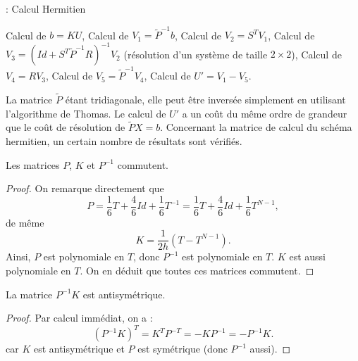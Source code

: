 \begin{center}
\begin{minipage}[H]{12cm}
  \begin{algorithm}[H]
    \caption{: Calcul Hermitien}\label{alg:SH}
    \begin{algorithmic}[1]
    \State Calcul de $b = K U$,
	\State Calcul de $V_1 = \tilde{P}^{-1} b$,
	\State Calcul de $V_2 = S^T V_1$,
	\State Calcul de $V_3 = (Id + S^T \tilde{P}^{-1}R)^{-1} V_2$ (résolution d'un système de taille $2 \times 2$),
	\State Calcul de $V_4 = R V_3$,
	\State Calcul de $V_5 = \tilde{P}^{-1} V_4$,
	\State Calcul de $U' = V_1 - V_5$.
    \end{algorithmic}
    \end{algorithm}
\end{minipage}
\end{center}
La matrice $\tilde{P}$ étant tridiagonale, elle peut être inversée simplement en utilisant l'algorithme de Thomas. Le calcul de $U'$ a un coût du même ordre de grandeur que le coût de résolution de $\tilde{P}X = b$. Concernant la matrice de calcul du schéma hermitien, un certain nombre de résultats sont vérifiés.

\begin{proposition}
Les matrices $P$, $K$ et $P^{-1}$ commutent.
\end{proposition}

\begin{proof}
On remarque directement que 
\begin{equation}
P = \dfrac{1}{6} T + \dfrac{4}{6} Id + \dfrac{1}{6} T^{-1} = \dfrac{1}{6} T + \dfrac{4}{6} Id + \dfrac{1}{6} T^{N-1},
\end{equation}
de même
\begin{equation}
K = \dfrac{1}{2h} \left( T - T^{N-1} \right).
\end{equation}
Ainsi, $P$ est polynomiale en $T$, donc $P^{-1}$ est polynomiale en $T$. $K$ est aussi polynomiale en $T$.
On en déduit que toutes ces matrices commutent.
\end{proof}

\begin{proposition}
La matrice $P^{-1}K$ est antisymétrique.
\end{proposition}

\begin{proof}
Par calcul immédiat, on a :
\begin{equation}
(P^{-1}K)^T = K^T P^{-T} = - K P^{-1} = - P^{-1} K.
\end{equation}
car $K$ est antisymétrique et $P$ est symétrique (donc $P^{-1}$ aussi). 
\end{proof}


























